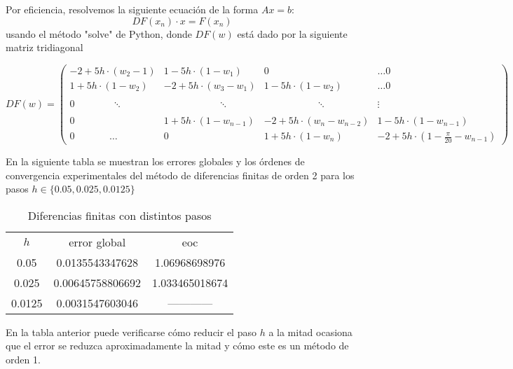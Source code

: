 \documentclass[11pt]{article}
\begin{document}
Por eficiencia, resolvemos la siguiente ecuación de la forma $Ax = b$:
$$
DF(x_n) \cdot x = F(x_n)
$$
usando el método "solve" de Python, donde $DF(w)$ está dado por la siguiente matriz tridiagonal 
\begin{adjustwidth*}{-2.9cm}{-2.2cm}
$$
DF(w) = 
\begin{pmatrix}
-2+5h \cdot (w_2-1)  & 1-5h \cdot (1-w_1)   & 0 & \dots 0\\
1+5h \cdot (1-w_2)  & -2+5h \cdot (w_3-w_1)  & 1-5h \cdot (1-w_2) & \dots 0\\
\\
0 \ \  \ \ \ \ \ \ \ \ \ \ \ \  \ \  \ \ddots & \ \ \ \ \ \ \ \ \  \ \ \ \ \ \  \ \ \ \ \ \ \ \ \ \  \  \ddots & \ \ \ \ \ \ \ \ \ \ \ \ \  \ \ \ \  \ \ \  \ \ \ \ \ \ddots & \vdots \\
\\

0 \ \  \ \ \ \ \ \ \ \ \ \ \ \ \ \ \ \  \ \  \  & 1+5h \cdot (1-w_{n-1})  & -2+5h \cdot (w_n-w_{n-2})  & 1-5h \cdot (1-w_{n-1}) \\
0 \ \  \ \ \ \ \ \ \ \ \ \ \ \ \ \ \dots & 0 & 1+5h \cdot (1-w_{n})  & -2+5h \cdot (1 - \frac{\pi}{20}-w_{n-1})
\end{pmatrix}
$$
\end{adjustwidth*}

En la siguiente tabla se muestran los errores globales y los órdenes de convergencia experimentales del método de diferencias finitas de orden 2 para los pasos $h \in \{ 0.05, 0.025,  0.0125 \}$

\begin{table}[h]
\caption{Diferencias finitas con distintos pasos}
\centering
\begin{tabular}{ccc}
\hline \hline
$h$ & error global & eoc \\
0.05 & 0.0135543347628 & 1.06968698976 \\
0.025 & 0.00645758806692 & 1.033465018674 \\
0.0125 & 0.0031547603046  & ------------ \\
\hline
\end{tabular}
\label{tab:hresult}
\end{table}
En la tabla anterior puede verificarse cómo reducir el paso $h$ a la mitad ocasiona que el error se reduzca aproximadamente la mitad y cómo este es un método de orden 1.
\end{document}
